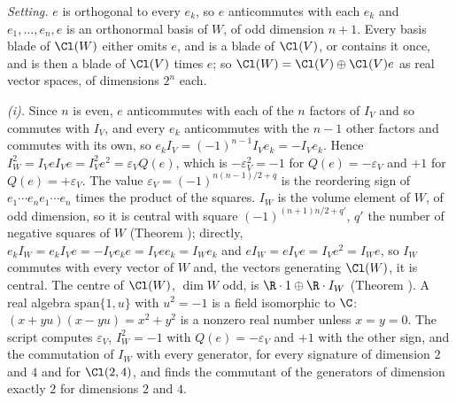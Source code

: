 \emph{Setting.} $e$ is orthogonal to every $e_{k}$, so $e$ anticommutes with each $e_{k}$ and $e_{1}, \dots, e_{n}, e$ is an orthonormal basis of $W$, of odd dimension $n + 1$. Every basis blade of $\Cl(W)$ either omits $e$, and is a blade of $\Cl(V)$, or contains it once, and is then a blade of $\Cl(V)$ times $e$; so $\Cl(W) = \Cl(V) \oplus \Cl(V)e$ as real vector spaces, of dimensions $2^{n}$ each.

\emph{(i).} Since $n$ is even, $e$ anticommutes with each of the $n$ factors of $I_{V}$ and so commutes with $I_{V}$, and every $e_{k}$ anticommutes with the $n - 1$ other factors and commutes with its own, so $e_{k}I_{V} = (-1)^{n-1}I_{V}e_{k} = -I_{V}e_{k}$. Hence $I_{W}^{2} = I_{V}eI_{V}e = I_{V}^{2}e^{2} = \varepsilon_{V}Q(e)$, which is $-\varepsilon_{V}^{2} = -1$ for $Q(e) = -\varepsilon_{V}$ and $+1$ for $Q(e) = +\varepsilon_{V}$. The value $\varepsilon_{V} = (-1)^{n(n-1)/2 + q}$ is the reordering sign of $e_{1}\cdots e_{n}e_{1}\cdots e_{n}$ times the product of the squares. $I_{W}$ is the volume element of $W$, of odd dimension, so it is central with square $(-1)^{(n+1)n/2 + q'}$, $q'$ the number of negative squares of $W$ (Theorem ); directly, $e_{k}I_{W} = e_{k}I_{V}e = -I_{V}e_{k}e = I_{V}ee_{k} = I_{W}e_{k}$ and $eI_{W} = eI_{V}e = I_{V}e^{2} = I_{W}e$, so $I_{W}$ commutes with every vector of $W$ and, the vectors generating $\Cl(W)$, it is central. The centre of $\Cl(W)$, $\dim W$ odd, is $\R \cdot 1 \oplus \R \cdot I_{W}$ (Theorem ). A real algebra $\mathrm{span}\{1, u\}$ with $u^{2} = -1$ is a field isomorphic to $\C$: $(x + yu)(x - yu) = x^{2} + y^{2}$ is a nonzero real number unless $x = y = 0$. The script computes $\varepsilon_{V}$, $I_{W}^{2} = -1$ with $Q(e) = -\varepsilon_{V}$ and $+1$ with the other sign, and the commutation of $I_{W}$ with every generator, for every signature of dimension $2$ and $4$ and for $\Cl(2,4)$, and finds the commutant of the generators of dimension exactly $2$ for dimensions $2$ and $4$.

